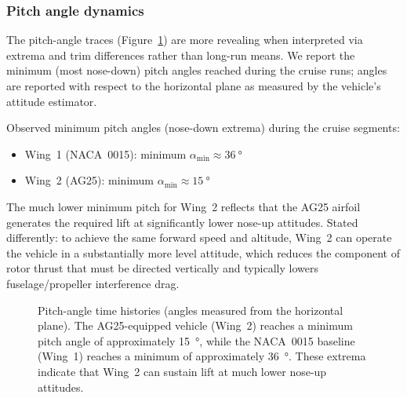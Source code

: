 \subsubsection{Pitch angle dynamics}

The pitch-angle traces (Figure~\ref{fig:wing_comparison_alpha}) are more revealing when interpreted via extrema and trim differences rather than long-run means. We report the minimum (most nose-down) pitch angles reached during the cruise runs; angles are reported with respect to the horizontal plane as measured by the vehicle's attitude estimator.

Observed minimum pitch angles (nose-down extrema) during the cruise segments:
\begin{itemize}
  \item Wing~1 (NACA~0015): minimum $\alpha_{\min} \approx \SI{36}{\degree}$
  \item Wing~2 (AG25):      minimum $\alpha_{\min} \approx \SI{15}{\degree}$
\end{itemize}

The much lower minimum pitch for Wing~2 reflects that the AG25 airfoil generates the required lift at significantly lower nose-up attitudes. Stated differently: to achieve the same forward speed and altitude, Wing~2 can operate the vehicle in a substantially more level attitude, which reduces the component of rotor thrust that must be directed vertically and typically lowers fuselage/propeller interference drag.

\begin{figure}[htbp]
  \centering
  \caption{Pitch-angle time histories (angles measured from the horizontal plane). The AG25-equipped vehicle (Wing~2) reaches a minimum pitch angle of approximately \SI{15}{\degree}, while the NACA~0015 baseline (Wing~1) reaches a minimum of approximately \SI{36}{\degree}. These extrema indicate that Wing~2 can sustain lift at much lower nose-up attitudes.}
  \label{fig:wing_comparison_alpha}
\end{figure}

